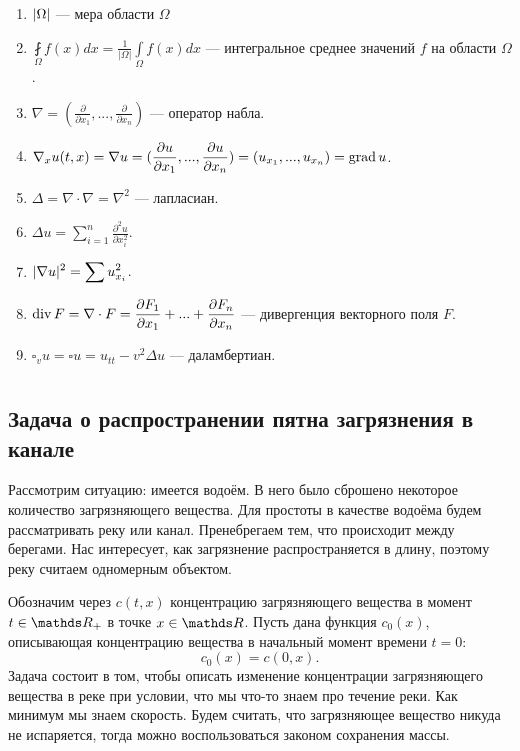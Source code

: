 \begin{enumerate}
\item $\lvert\Omega\rvert$ --- мера области $\Omega$
\item $\displaystyle \fint \limits_{\Omega} f(x) dx = \frac{1}{|\Omega|} \int \limits_{\Omega} f(x) dx$ --- интегральное среднее значений $f$ на области $\Omega$.
\item $\displaystyle \nabla = (\frac {\partial} {\partial x_1}, ... , \frac {\partial} {\partial x_n}) $ --- оператор набла.
\item $\displaystyle \nabla_x u(t,x)  = \nabla u = (\frac {\partial u} {\partial x_1}, ..., \frac {\partial u} {\partial x_n}) = (u_{x_1}, ..., u_{x_n}) = \operatorname{grad} u $.
\item $\displaystyle \Delta = \nabla \cdot \nabla = \nabla^2$ --- лапласиан.
\item $\displaystyle \Delta u = \sum \limits_{i=1}^n \frac {\partial^2 u} {\partial x_i^2}$.
\item $\displaystyle \lvert\nabla u\rvert^2 = \sum u_{x_i}^2$.
\item $\displaystyle \operatorname{div} F = \nabla \cdot F = \frac {\partial F_1} {\partial x_1} + ... + \frac {\partial F_n} {\partial x_n}$ --- дивергенция векторного поля $F$.
\item $\square_v u = \square u = u_{tt} - v^2 \Delta u$ --- даламбертиан.

\end{enumerate}

\chapter{}
\section{Задача о распространении пятна загрязнения в канале}
Рассмотрим ситуацию: имеется водоём. В него было сброшено некоторое количество загрязняющего вещества.
Для простоты в качестве водоёма будем рассматривать реку или канал. Пренебрегаем тем, что происходит между берегами. Нас интересует, как загрязнение распространяется в длину, поэтому реку считаем одномерным объектом.

Обозначим через $c (t, x) $ концентрацию загрязняющего вещества в момент $t \in \real_+$ в точке $x \in \real$. Пусть дана функция $ c_0 (x) $, описывающая концентрацию вещества в начальный момент времени $ t = 0 $:
$$ c_0 (x) = c (0, x).$$
Задача состоит в том, чтобы описать изменение концентрации загрязняющего вещества в реке при условии, что мы что-то знаем про течение реки. Как минимум мы знаем скорость. Будем считать, что загрязняющее вещество никуда не испаряется, тогда можно воспользоваться законом сохранения массы.

